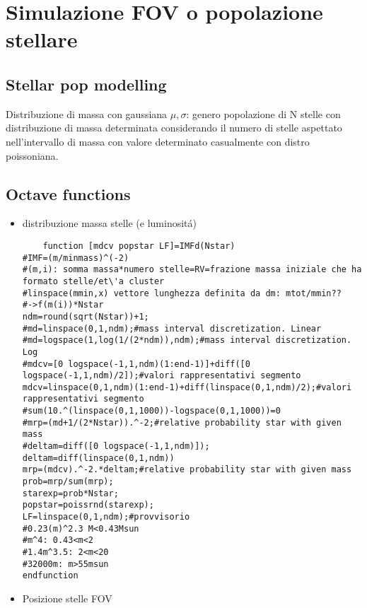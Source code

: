 \documentclass[main.tex]{subfiles}
\begin{document}

\chapter{Simulazione FOV o popolazione stellare}

\section{Stellar pop modelling}

Distribuzione di massa con gaussiana $\mu, \sigma$: genero popolazione di N stelle con distribuzione di massa determinata considerando il numero di stelle aspettato nell'intervallo di massa con valore determinato casualmente con distro poissoniana.

\section{Octave functions}

\begin{itemize}
\item distribuzione massa stelle (e luminosit\'a)

\begin{lstlisting}
    function [mdcv popstar LF]=IMFd(Nstar)
#IMF=(m/minmass)^(-2)
#(m,i): somma massa*numero stelle=RV=frazione massa iniziale che ha formato stelle/et\'a cluster
#linspace(mmin,x) vettore lunghezza definita da dm: mtot/mmin??
#->f(m(i))*Nstar
ndm=round(sqrt(Nstar))+1;
#md=linspace(0,1,ndm);#mass interval discretization. Linear
#md=logspace(1,log(1/(2*ndm)),ndm);#mass interval discretization. Log
#mdcv=[0 logspace(-1,1,ndm)(1:end-1)]+diff([0 logspace(-1,1,ndm)/2]);#valori rappresentativi segmento
mdcv=linspace(0,1,ndm)(1:end-1)+diff(linspace(0,1,ndm)/2);#valori rappresentativi segmento
#sum(10.^(linspace(0,1,1000))-logspace(0,1,1000))=0
#mrp=(md+1/(2*Nstar)).^-2;#relative probability star with given mass
#deltam=diff([0 logspace(-1,1,ndm)]);
deltam=diff(linspace(0,1,ndm))
mrp=(mdcv).^-2.*deltam;#relative probability star with given mass
prob=mrp/sum(mrp);
starexp=prob*Nstar;
popstar=poissrnd(starexp);
LF=linspace(0,1,ndm);#provvisorio
#0.23(m)^2.3 M<0.43Msun
#m^4: 0.43<m<2
#1.4m^3.5: 2<m<20
#32000m: m>55msun
endfunction
\end{lstlisting}

\item Posizione stelle FOV
    
    
\end{itemize}
\end{document}
